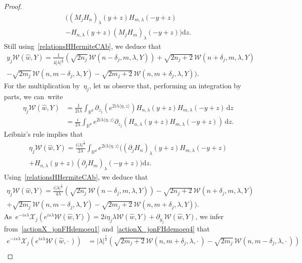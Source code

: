\documentclass[10pt]{amsart}
\theoremstyle{definition}\newtheorem{defi}[theo]{Definition}\newtheorem{rema}[theo]{Remark}\newtheorem{exam}[theo]{Example}\newtheorem{exem}[theo]{Example}\newtheorem{nota}[theo]{Notation}
\newcommand{\lam}{\lambda}
\newcommand{\wh}{\widehat}
\newcommand*\cW{\mathcal{W}}
\newcommand*\cX{\mathcal{X}}
\newcommand*\R{\mathbb{R}}
\newcommand*{\dd}{\mathrm{d}}
\newcommand{\dz}{\dd z}
\renewcommand*{\cdotp}{.}
\begin{document}
\begin{proof}
\begin{multline*}
\Big((M_jH_n)_\lam (y+z) H_{m,\lam}(-y+z)\\
- H_{n,\lam}(y+z) (M_jH_m)_\lam(-y+z)\Big)\dz.
\end{multline*}
Still using~\eqref{relationsHHermiteCAb}, we deduce that
\begin{multline}\label{actionX_jonFHdemoeq3}
\!\! y_j \cW(\wh w,Y) = \frac 1 {4|\lam|^{\frac 12} } \left(\sqrt {2n_j} \,\cW(n\!-\!\delta_j,m,\lam,Y) \right)\!+\!\sqrt {2n_j\!+\!2}\,\cW(n\!+\!\delta_j,m,\lam,Y) \\
-\sqrt {2m_j}\,\cW(n,m-\delta_j,\lam,Y) -\sqrt {2m_j+2}\,\cW(n,m+\delta_j,\lam,Y)).\!\!
\end{multline}
For the multiplication by~$\eta_j$, let us observe that, performing an integration by parts, we can~write
\[
\begin{aligned}
\eta_j\cW(\wh w,Y) & = \frac 1 {2i\lam} \int_{\R^d} \partial_{z_j} \left(e^{2i\lam\langle \eta,z\rangle} \right) H_{n,\lam} (y+z) H_{m,\lam}(-y+z)\, \dz\\
& = \frac i {2\lam} \int_{\R^d} e^{2i\lam\langle \eta,z\rangle}\partial_{z_j} \left(H_{n,\lam} (y+z) H_{m,\lam}(-y+z) \right)\,\dz.
\end{aligned}
\]
Leibniz's rule implies that
\begin{multline*}
\eta_j\cW(\wh w,Y) = \frac {i|\lam|^{\frac 12}} {2\lam} \int_{\R^d} e^{2i\lam\langle \eta,z\rangle} \Big((\partial_jH_{n})_\lam (y+z) H_{m,\lam}(-y+z) \\
+ H_{n,\lam} (y+z) (\partial_j H_m)_\lam (-y+z) \Big)\dz.
\end{multline*}
Using~\eqref{relationsHHermiteCAb}, we deduce that
\begin{multline}\label{actionX_jonFHdemoeq4}
\!\!\eta_j \cW(\wh w,Y) = \frac {i |\lam|^{\frac 12} } {4\lam} (\sqrt {2n_j} \,\cW(n\!-\!\delta_j,m,\lam,Y)) -\sqrt {2n_j\!+\!2}\, \cW(n\!+\!\delta_j,m,\lam,Y) \\
+\sqrt {2m_j}\,\cW(n,m-\delta_j,\lam,Y) -\sqrt {2m_j+2}\,\cW(n,m+\delta_j,\lam,Y))\cdotp\!\!
\end{multline}
As~$e^{-is\lam} \cX_j\left(e^{is\lam}\cW(\wh w,Y) \right) = 2i\eta_j \lam\cW(\wh w,Y) +\partial_{y_j} \cW(\wh w,Y)$, we infer from~\eqref{actionX_jonFHdemoeq1} and~\eqref{actionX_jonFHdemoeq4} that
\[
\begin{aligned}
e^{-is\lam} \cX_j\left(e^{is\lam}\cW(\wh w,{\cdot\,}) \right) &\! =\! |\lam|^{\frac 12} \left(\sqrt {2m_j\!+\!2}\,\cW(n,m\!+\!\delta_j,\lam,{\cdot\,})-\sqrt {2m_j}\,\cW(n,m\!-\!\delta_j,\lam,{\cdot\,})\right)\\

\end{aligned}\]
\end{proof}
\end{document}
